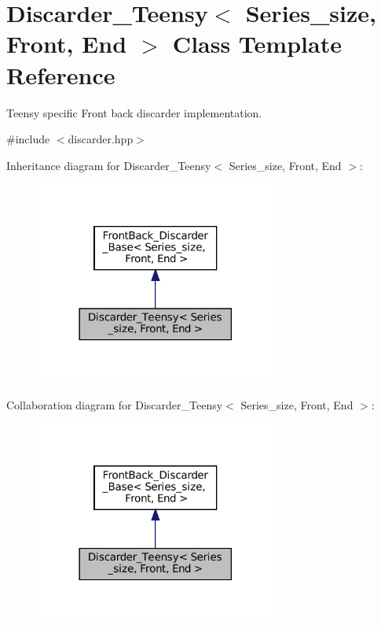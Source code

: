\hypertarget{classDiscarder__Teensy}{}\section{Discarder\+\_\+\+Teensy$<$ Series\+\_\+size, Front, End $>$ Class Template Reference}
\label{classDiscarder__Teensy}


Teensy specific Front back discarder implementation.  




{\ttfamily \#include $<$discarder.\+hpp$>$}



Inheritance diagram for Discarder\+\_\+\+Teensy$<$ Series\+\_\+size, Front, End $>$\+:\nopagebreak
\begin{figure}[H]
\begin{center}
\leavevmode
\includegraphics[width=225pt]{classDiscarder__Teensy__inherit__graph}
\end{center}
\end{figure}


Collaboration diagram for Discarder\+\_\+\+Teensy$<$ Series\+\_\+size, Front, End $>$\+:\nopagebreak
\begin{figure}[H]
\begin{center}
\leavevmode
\includegraphics[width=225pt]{classDiscarder__Teensy__coll__graph}
\end{center}
\end{figure}
